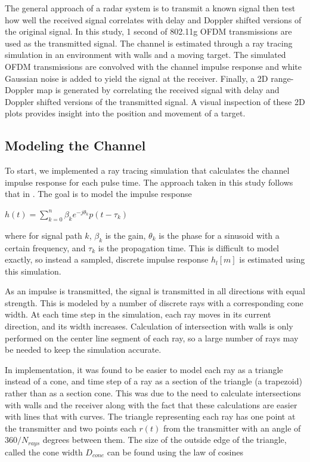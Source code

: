 \documentclass[article,11pt,onecolumn,final]{IEEEtran}
\begin{document}
The general approach of a radar system is to transmit a known signal then test how well the received signal correlates with delay and Doppler shifted versions of the original signal. In this study, 1 second of 802.11g OFDM transmissions are used as the transmitted signal. The channel is estimated through a ray tracing simulation in an environment with walls and a moving target. The simulated OFDM transmissions are convolved with the channel impulse response and white Gaussian noise is added to yield the signal at the receiver. Finally, a 2D range-Doppler map is generated by correlating the received signal with delay and Doppler shifted versions of the transmitted signal. A visual inspection of these 2D plots provides insight into the position and movement of a target.

\subsection{Modeling the Channel}

To start, we implemented a ray tracing simulation that calculates the channel impulse response for each pulse time. The approach taken in this study follows that in \cite{Holt}. The goal is to model the impulse response

$ h(t) = \sum_{k=0}^{n} \beta_k e^{-j \theta_k} p(t - \tau_k) $

where for signal path $k$, $\beta_k$ is the gain, $\theta_k$ is the phase for a sinusoid with a certain frequency, and $\tau_k$ is the propagation time. This is difficult to model exactly, so instead a sampled, discrete impulse response $h_l[m]$ is estimated using this simulation. 

As an impulse is transmitted, the signal is transmitted in all directions with equal strength. This is modeled by a number of discrete rays with a corresponding cone width. At each time step in the simulation, each ray moves in its current direction, and its width increases. Calculation of intersection with walls is only performed on the center line segment of each ray, so a large number of rays may be needed to keep the simulation accurate. 

In implementation, it was found to be easier to model each ray as a triangle instead of a cone, and time step of a ray as a section of the triangle (a trapezoid) rather than as a section cone. This was due to the need to calculate intersections with walls and the receiver along with the fact that these calculations are easier with lines that with curves. The triangle representing each ray has one point at the transmitter and two points each $r(t)$ from the transmitter with an angle of $360/N_{rays}$ degrees between them. The size of the outside edge of the triangle, called the cone width $D_{cone}$ can be found using the law of cosines
\end{document}
